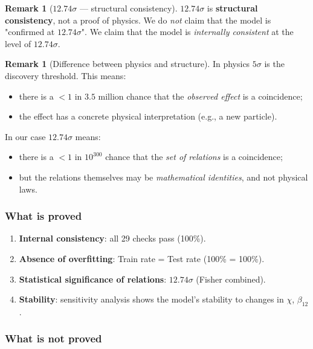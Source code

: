 \documentclass[11pt,a4paper]{article}
\theoremstyle{definition}
\newtheorem{remark}[theorem]{Remark}
\begin{document}
\begin{remark}[$12.74\sigma$ --- structural consistency]
\label{rem:sigma-structural}
$12.74\sigma$ is \textbf{structural consistency},
not a proof of physics. We do \emph{not} claim that
the model is "confirmed at $12.74\sigma$". We claim
that the model is \emph{internally consistent} at the level of $12.74\sigma$.
\end{remark}

\begin{remark}[Difference between physics and structure]
\label{rem:physics-vs-structure}
In physics $5\sigma$ is the discovery threshold. This means:
\begin{itemize}
    \item there is a $< 1$ in $3.5$ million chance that
          the \emph{observed effect} is a coincidence;
    \item the effect has a concrete physical interpretation
          (e.g., a new particle).
\end{itemize}
In our case $12.74\sigma$ means:
\begin{itemize}
    \item there is a $< 1$ in $10^{300}$ chance that
          the \emph{set of relations} is a coincidence;
    \item but the relations themselves may be \emph{mathematical
          identities}, and not physical laws.
\end{itemize}
\end{remark}

\subsubsection{What is proved}

\begin{enumerate}
    \item \textbf{Internal consistency}: all 29 checks
          pass (100\%).
    \item \textbf{Absence of overfitting}: Train rate = Test rate
          (100\% = 100\%).
    \item \textbf{Statistical significance of relations}:
          $12.74\sigma$ (Fisher combined).
    \item \textbf{Stability}: sensitivity analysis shows
          the model's stability to changes in $\chi$, $\beta_{12}$.
\end{enumerate}

\subsubsection{What is not proved}
\end{document}
